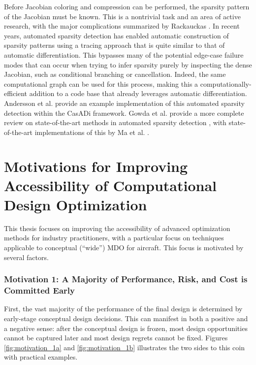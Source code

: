 Before Jacobian coloring and compression can be performed, the sparsity pattern of the Jacobian must be known. This is a nontrivial task and an area of active research, with the major complications summarized by Rackauckas \cite{rackauckas_generalizing_2021}. In recent years, automated sparsity detection has enabled automatic construction of sparsity patterns using a tracing approach that is quite similar to that of automatic differentiation. This bypasses many of the potential edge-case failure modes that can occur when trying to infer sparsity purely by inspecting the dense Jacobian, such as conditional branching or cancellation. Indeed, the same computational graph can be used for this process, making this a computationally-efficient addition to a code base that already leverages automatic differentiation. Andersson et al. \cite{casadi} provide an example implementation of this automated sparsity detection within the CasADi framework. Gowda et al. provide a more complete review on state-of-the-art methods in automated sparsity detection \cite{gowda_sparsity_2019}, with state-of-the-art implementations of this by Ma et al. \cite{ma_modelingtoolkit_2021}.



\section{Motivations for Improving Accessibility of Computational Design Optimization}
\label{sec:motivation}

This thesis focuses on improving the accessibility of advanced optimization methods for industry practitioners, with a particular focus on techniques applicable to conceptual (``wide'') MDO for aircraft. This focus is motivated by several factors.

\subsubsection*{Motivation 1: A Majority of Performance, Risk, and Cost is Committed Early}

First, the vast majority of the performance of the final design is determined by early-stage conceptual design decisions. This can manifest in both a positive and a negative sense: after the conceptual design is frozen, most design opportunities cannot be captured later and most design regrets cannot be fixed. Figures \ref{fig:motivation_1a} and \ref{fig:motivation_1b} illustrates the two sides to this coin with practical examples.

